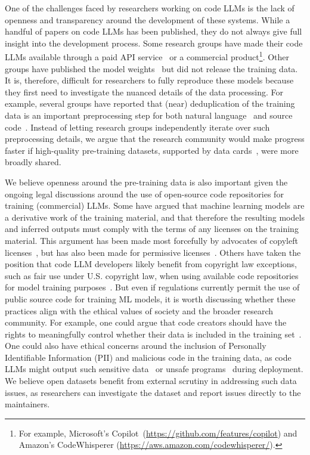 One of the challenges faced by researchers working on code LLMs is the lack of openness and transparency around the development of these systems. While a handful of papers on code LLMs has been published, they do not always give full insight into the development process. Some research groups have made their code LLMs available through a paid API service~\citep{chen2021codex} or a commercial product\footnote{For example, Microsoft's Copilot~(\url{https://github.com/features/copilot}) and Amazon's  CodeWhisperer (\url{https://aws.amazon.com/codewhisperer/}).}. Other groups have published the model weights~\citep{Nijkamp2022ACP,fried2022incoder} but did not release the training data. It is, therefore, difficult for researchers to fully reproduce these models because they first need to investigate the nuanced details of the data processing. For example, several groups have reported that (near) deduplication of the training data is an important preprocessing step for both natural language~\citep{kandpal2022deduplicating,hernandez2022scaling} and source code~\citep{allamanis2019duplication}. Instead of letting research groups independently iterate over such preprocessing details, we argue that the research community would make progress faster if high-quality pre-training datasets, supported by data cards~\citep{gebru2021datasheets,bender-friedman-2018-data}, were more broadly shared. 

We believe openness around the pre-training data is also important given the ongoing legal discussions around the use of open-source code repositories for training (commercial) LLMs. Some have argued that machine learning models are a derivative work of the training material, and that therefore the resulting models and inferred outputs must comply with the terms of any licenses on the training material. This argument has been made most forcefully by advocates of copyleft licenses~\citep{kuhn2022copilot}, but has also been made for permissive licenses~\citep{butterick2022copilot}. Others have taken the position that code LLM developers likely benefit from copyright law exceptions, such as fair use under U.S. copyright law, when using available code repositories for model training purposes~\citep{rothchild2022copyright}. But even if regulations currently permit the use of public source code for training ML models, it is worth discussing whether these practices align with the ethical values of society and the broader research community. For example, one could argue that code creators should have the rights to meaningfully control whether their data is included in the training set~\citep{jernite2022datagovernance}. One could also have ethical concerns around the inclusion of Personally Identifiable Information (PII) and malicious code in the training data, as code LLMs might output such sensitive data~\citep{carlini21extracting,kandpal2022deduplicating} or unsafe programs~\citep{khlaaf2022hazard} during deployment. We believe open datasets benefit from external scrutiny in addressing such data issues, as researchers  can investigate the dataset and report issues directly to the maintainers. 

